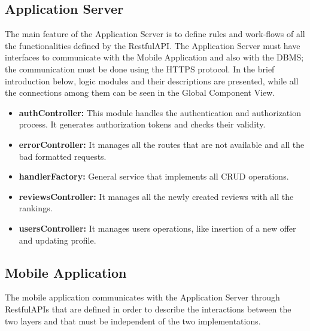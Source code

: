 \documentclass[../../dd.tex]{subfiles}
\begin{document}
    \subsection{Application Server}
    The main feature of the Application Server is to define rules and work-flows
    of all the functionalities defined by the RestfulAPI.
    The Application Server must have interfaces to communicate with the Mobile
    Application and also with the DBMS; the communication must be done using
    the HTTPS protocol.
    In the brief introduction below, logic modules and their descriptions are
    presented, while all the connections among them can be seen in the Global
    Component View.
    \begin{itemize}
        \item \textbf{authController:} This module handles the authentication and authorization process.
        It generates authorization tokens and checks their validity.
        \item \textbf{errorController:} It manages all the routes that are not available and all the bad formatted requests.
        \item \textbf{handlerFactory:} General service that implements all CRUD operations.
        \item \textbf{reviewsController:} It manages all the newly created reviews with all the rankings.
        \item \textbf{usersController:} It manages users operations, like insertion of a new offer and updating profile.
    \end{itemize}

    \subsection{Mobile Application}
    The mobile application communicates with the Application Server
    through RestfulAPIs that are defined in order to describe the interactions
    between the two layers and that must be independent of the two implementations.
\end{document}
